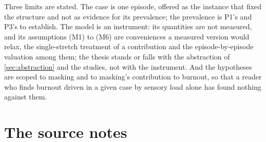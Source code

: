 Three limits are stated. The case is one episode, offered as the instance that fixed the structure and not as evidence for its prevalence; the prevalence is P1's and P3's to establish. The model is an instrument: its quantities are not measured, and its assumptions (M1) to (M6) are conveniences a measured version would relax, the single-stretch treatment of a contribution and the episode-by-episode valuation among them; the thesis stands or falls with the abstraction of \autoref{sec:abstraction} and the studies, not with the instrument. And the hypotheses are scoped to masking and to masking's contribution to burnout, so that a reader who finds burnout driven in a given case by sensory load alone has found nothing against them.

\appendix
\section{The source notes}\label{app:note}

